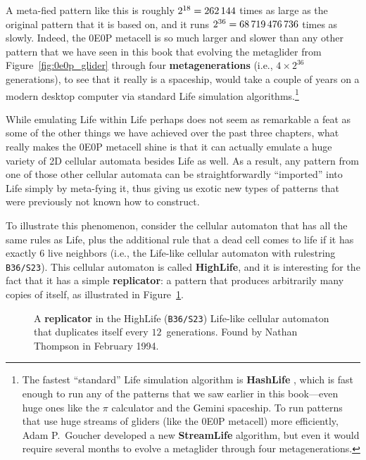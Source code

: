 A meta-fied pattern like this is roughly $2^{18} = 262{\,}144$ times as large as the original pattern that it is based on, and it runs $2^{36} = 68{\,}719{\,}476{\,}736$ times as slowly. Indeed, the 0E0P metacell is so much larger and slower than any other pattern that we have seen in this book that evolving the metaglider from Figure~\ref{fig:0e0p_glider} through four \textbf{metagenerations} (i.e., $4 \times 2^{36}$ generations), to see that it really is a spaceship, would take a couple of years on a modern desktop computer via standard Life simulation algorithms.\footnote{The fastest ``standard'' Life simulation algorithm is \textbf{HashLife} \cite{Gos84}, which is fast enough to run any of the patterns that we saw earlier in this book---even huge ones like the $\pi$ calculator and the Gemini spaceship. To run patterns that use huge streams of gliders (like the 0E0P metacell) more efficiently, Adam P.~Goucher developed a new \textbf{StreamLife} algorithm, but even it would require several months to evolve a metaglider through four metagenerations.}

While emulating Life within Life perhaps does not seem as remarkable a feat as some of the other things we have achieved over the past three chapters, what really makes the 0E0P metacell shine is that it can actually emulate a huge variety of 2D cellular automata besides Life as well. As a result, any pattern from one of those other cellular automata can be straightforwardly ``imported'' into Life simply by meta-fying it, thus giving us exotic new types of patterns that were previously not known how to construct.

To illustrate this phenomenon, consider the cellular automaton that has all the same rules as Life, plus the additional rule that a dead cell comes to life if it has exactly $6$ live neighbors (i.e., the Life-like cellular automaton with rulestring \texttt{B36/S23}). This cellular automaton is called \textbf{HighLife}, and it is interesting for the fact that it has a simple \textbf{replicator}: a pattern that produces arbitrarily many copies of itself, as illustrated in Figure~\ref{fig:highlife_replicator}.

\begin{figure}[!htb]
	\centering
	\caption{A \textbf{replicator} in the HighLife (\texttt{B36/S23}) Life-like cellular automaton that duplicates itself every $12$~generations. Found by Nathan Thompson in February 1994.}\label{fig:highlife_replicator}
\end{figure}

